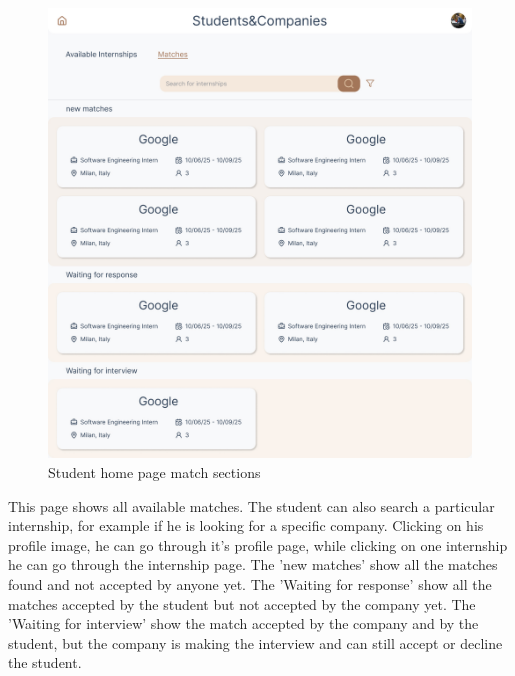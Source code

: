\documentclass{article}
\begin{document}
\begin{figure}[H]
    \centering
    \includegraphics[width=1\linewidth]{interface/Match - Studente.jpg}
    \caption{Student home page match sections}
    \label{fig:enter-label}
\end{figure}
This page shows all available matches. The student can also search a particular internship, for example if he is looking for a specific company. Clicking on his profile image, he can go through it's profile page, while clicking on one internship he can go through the internship page.\newline
The 'new matches' show all the matches found and not accepted by anyone yet. The 'Waiting for response' show all the matches accepted by the student but not accepted by the company yet.
The 'Waiting for interview' show the match accepted by the company and by the student, but the company is making the interview and can still accept or decline the student.
\end{document}

